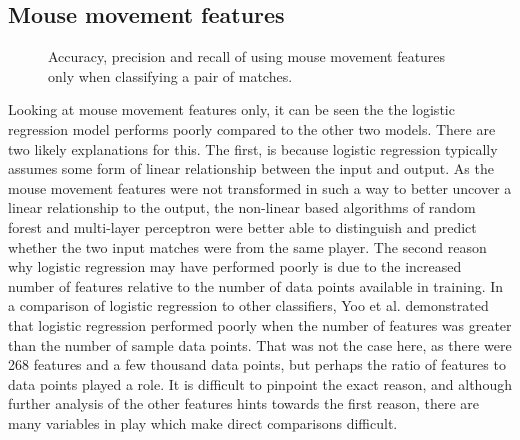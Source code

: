 \documentclass[Report.tex]{subfiles}
\newcommand{\baraxis}[8]{
\begin{axis}[
    ybar,
    title={#1},
    width=#5,
    height=#6,
    ymin=#3, ymax=#4,
    bar width=1em,
    legend style={at={#7},anchor=north,legend columns=-1},
    enlarge x limits=0.4,
    x tick label style={align=center,text width=#8},
    symbolic x coords={Logistic Regression, Random Forest, Multi-layer Perceptron},
    xtick=data,
    ylabel={#2}
]
}
\newcommand{\plotbar}[5]{
\addplot+[
	discard if not={numSplits}{#1},
	discard if not={split}{#2},
	discard if not={features}{#3},
] table [x=model, y=#4,col sep=comma] {data/19-pair-cv.csv};
\addlegendentry{#5}
}
\begin{document}

\subsection{Mouse movement features}

\begin{figure}[H]
\centering
{}
\caption{Accuracy, precision and recall of using mouse movement features only when classifying a pair of matches.}
\end{figure}

Looking at mouse movement features only, it can be seen the the logistic regression model performs poorly compared to the other two models. There are two likely explanations for this. The first, is because logistic regression typically assumes some form of linear relationship between the input and output. As the mouse movement features were not transformed in such a way to better uncover a linear relationship to the output, the non-linear based algorithms of random forest and multi-layer perceptron were better able to distinguish and predict whether the two input matches were from the same player. The second reason why logistic regression may have performed poorly is due to the increased number of features relative to the number of data points available in training. In a comparison of logistic regression to other classifiers, Yoo et al. \cite{lr-vs-rf} demonstrated that logistic regression performed poorly when the number of features was greater than the number of sample data points. That was not the case here, as there were 268 features and a few thousand data points, but perhaps the ratio of features to data points played a role. It is difficult to pinpoint the exact reason, and although further analysis of the other features hints towards the first reason, there are many variables in play which make direct comparisons difficult. 
\end{document}
